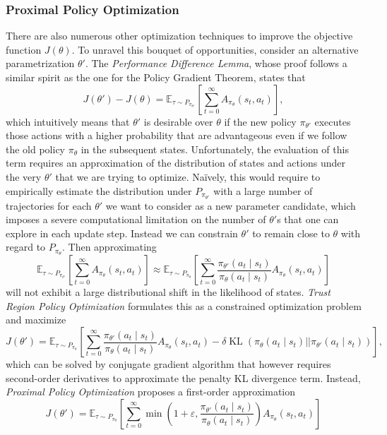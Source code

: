 \documentclass[a4paper, 11pt]{article}
\begin{document}
	\subsubsection{Proximal Policy Optimization}
	There are also numerous other optimization techniques to improve the objective function $J(\theta)$. To unravel this bouquet of opportunities, consider an alternative parametrization $\theta'$. The \textit{Performance Difference Lemma}, whose proof follows a similar spirit as the one for the Policy Gradient Theorem, states that 
	\[J(\theta')-J(\theta)=\mathbb{E}_{\tau\sim P_{\pi_{\theta'}}}\left[\sum_{t=0}^{\infty} A_{\pi_{\theta}}(s_t,a_t) \right],\]
	which intuitively means that $\theta'$ is desirable over $\theta$ if the new policy $\pi_{\theta'}$ executes those actions with a higher probability that are advantageous even if we follow the old policy $\pi_{\theta}$ in the subsequent states. Unfortunately, the evaluation of this term requires an approximation of the distribution of states and actions under the very $\theta'$ that we are trying to optimize. Na\"ively, this would require to empirically estimate the distribution under $P_{\pi_{\theta'}}$ with a large number of trajectories for each $\theta'$ we want to consider as a new parameter candidate, which imposes a severe computational limitation on the number of $\theta'$s that one can explore in each update step.
	Instead we can constrain $\theta'$ to remain close to $\theta$ with regard to $P_{\pi_{\theta}}$. Then approximating 
	\[\mathbb{E}_{\tau\sim P_{\pi_{\theta'}}}\left[\sum_{t=0}^{\infty} A_{\pi_{\theta}}(s_t,a_t) \right]\approx\mathbb{E}_{\tau\sim P_{\pi_{\theta}}}\left[\sum_{t=0}^{\infty} \frac{\pi_{\theta'}(a_t\mid s_t)}{\pi_{\theta}(a_t\mid s_t)}A_{\pi_{\theta}}(s_t,a_t) \right]\]
	will not exhibit a large distributional shift in the likelihood of states. \textit{Trust Region Policy Optimization} formulates this as a constrained optimization problem and maximize
	\[J(\theta')=\mathbb{E}_{\tau\sim P_{\pi_{\theta}}}\left[\sum_{t=0}^{\infty} \frac{\pi_{\theta'}(a_t\mid s_t)}{\pi_{\theta}(a_t\mid s_t)}A_{\pi_{\theta}}(s_t,a_t) - \delta \operatorname{KL}\left(\pi_{\theta}(a_t\mid s_t)||\pi_{\theta'}(a_t\mid s_t)\right) \right],\]
	which can be solved by conjugate gradient algorithm that however requires second-order derivatives to approximate the penalty KL divergence term. Instead, \textit{Proximal Policy Optimization} proposes a first-order approximation 
	\[J(\theta')=\mathbb{E}_{\tau\sim P_{\pi_{\theta}}}\left[\sum_{t=0}^{\infty} \min\left(1+\varepsilon,\frac{\pi_{\theta'}(a_t\mid s_t)}{\pi_{\theta}(a_t\mid s_t)}\right)A_{\pi_{\theta}}(s_t,a_t)\right]\]
\end{document}
